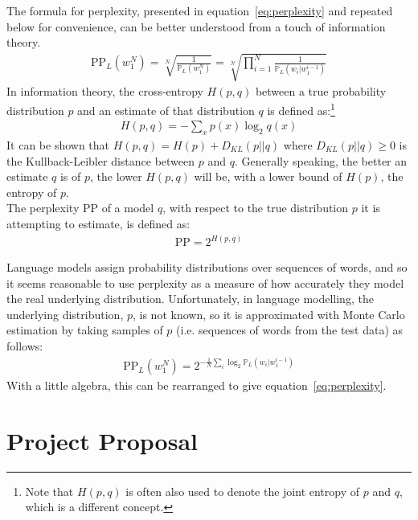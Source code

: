 \documentclass[a4paper, 12pt]{report}
\begin{document}
The formula for perplexity, presented in equation~\ref{eq:perplexity} and repeated below for convenience, can be better understood from a touch of information theory.
\begin{gather*}
	\text{PP}_L(w_1^N) = \sqrt[N]{\frac{1}{\mathbb{P}_L(w_1^N)}} = \sqrt[N]{\prod_{i=1}^{N}\frac{1}{\mathbb{P}_L(w_i | w_1^{i-1})}}
\end{gather*}
In information theory, the cross-entropy $H(p, q)$ between a true probability distribution $p$ and an estimate of that distribution $q$ is defined as:\footnote{Note that $H(p, q)$ is often also used to denote the joint entropy of $p$ and $q$, which is a different concept.}
\begin{gather*}
	H(p, q) = -\sum_x p(x) \log_2 q(x)
\end{gather*}
It can be shown that $H(p, q) = H(p) + D_{KL}(p || q)$ where $D_{KL}(p || q) \geq 0$ is the Kullback-Leibler distance between $p$ and $q$. Generally speaking, the better an estimate $q$ is of $p$, the lower $H(p, q)$ will be, with a lower bound of $H(p)$, the entropy of $p$. \\

The perplexity PP of a model $q$, with respect to the true distribution $p$ it is attempting to estimate, is defined as:
\begin{gather*}
	\text{PP} = 2^{H(p, q)}
\end{gather*}

Language models assign probability distributions over sequences of words, and so it seems reasonable to use perplexity as a measure of how accurately they model the real underlying distribution. Unfortunately, in language modelling, the underlying distribution, $p$, is not known, so it is approximated with Monte Carlo estimation by taking samples of $p$ (i.e. sequences of words from the test data) as follows:
\begin{gather*}
	\text{PP}_L(w_1^N) = 2^{-\frac{1}{N}\sum_i \log_2 \mathbb{P}_L(w_i | w_1^{i-1})}
\end{gather*}
With a little algebra, this can be rearranged to give equation~\ref{eq:perplexity}. \\

\chapter{Project Proposal}

\end{document}
